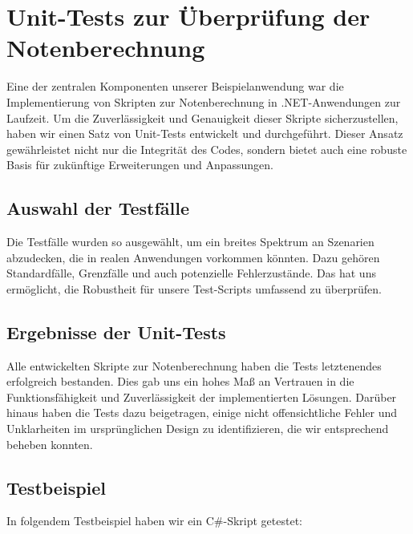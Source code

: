 \newpage
\section{Unit-Tests zur Überprüfung der Notenberechnung}

Eine der zentralen Komponenten unserer Beispielanwendung war die Implementierung von 
Skripten zur Notenberechnung in .NET-Anwendungen zur Laufzeit. Um die Zuverlässigkeit und 
Genauigkeit dieser Skripte sicherzustellen, haben wir einen Satz von Unit-Tests entwickelt 
und durchgeführt. Dieser Ansatz gewährleistet nicht nur die Integrität des Codes, 
sondern bietet auch eine robuste Basis für zukünftige Erweiterungen und Anpassungen.

\subsection*{Auswahl der Testfälle}
Die Testfälle wurden so ausgewählt, um ein breites Spektrum an Szenarien abzudecken, 
die in realen Anwendungen vorkommen könnten. Dazu gehören Standardfälle, Grenzfälle und 
auch potenzielle Fehlerzustände. Das hat uns ermöglicht, die Robustheit für unsere Test-Scripts 
umfassend zu überprüfen.

\subsection*{Ergebnisse der Unit-Tests}
Alle entwickelten Skripte zur Notenberechnung haben die Tests letztenendes erfolgreich bestanden. 
Dies gab uns ein hohes Maß an Vertrauen in die Funktionsfähigkeit und Zuverlässigkeit der 
implementierten Lösungen. Darüber hinaus haben die Tests dazu beigetragen, einige nicht 
offensichtliche Fehler und Unklarheiten im ursprünglichen Design zu identifizieren, 
die wir entsprechend beheben konnten.

\newpage
\subsection*{Testbeispiel}

In folgendem Testbeispiel haben wir ein C\#-Skript getestet:


